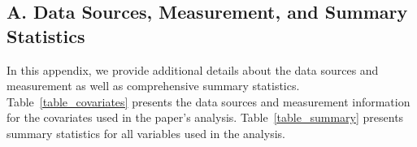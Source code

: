 \documentclass{cup_PSRM}
\begin{document}
\onehalfspacing







\clearpage
\subsection{A. Data Sources, Measurement, and Summary Statistics}\label{appendix_datasources}
\setcounter{table}{0}
\setcounter{figure}{0}
\renewcommand{\thetable}{A\arabic{table}}
\renewcommand{\thefigure}{A\arabic{figure}}

\noindent In this appendix, we provide additional details about the data sources and measurement as well as comprehensive summary statistics.  Table~\ref{table_covariates} presents the data sources and measurement information for the covariates used in the paper's analysis.  Table~\ref{table_summary} presents summary statistics for all variables used in the analysis.




\end{document}
